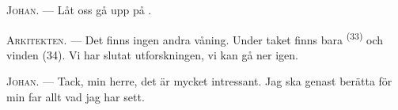 \textsc{Johan}. --- Låt oss gå upp på .

\textsc{Arkitekten}. --- Det finns ingen andra våning. Under taket finns bara
 \textsuperscript{(33)} och vinden (34). Vi har slutat
utforskningen, vi kan gå ner igen.

\textsc{Johan}. --- Tack, min herre, det är mycket intressant. Jag ska genast berätta för min
far allt vad jag har sett.
\VUsaut{4.0mm}
\VUfilet{22mm}
